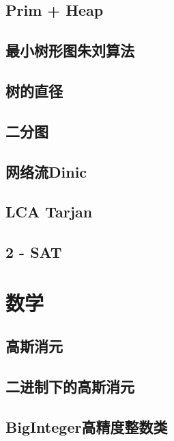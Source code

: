 \documentclass[a4paper, 12pt, twoside]{article}
\begin{document}
\subsection{Prim + Heap}

\subsection{最小树形图朱刘算法}

\subsection{树的直径}

\subsection{二分图}

\subsection{网络流Dinic}

\subsection{LCA Tarjan}

\subsection{2 - SAT}



\section{数学}
\subsection{高斯消元}

\subsection{二进制下的高斯消元}

\subsection{BigInteger高精度整数类}

\end{document}
